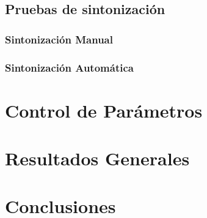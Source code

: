 \documentclass{beamer}
\begin{document}
\subsection{Pruebas de sintonización}
\subsubsection{Sintonización Manual}

\subsubsection{Sintonización Automática}

\section{Control de Parámetros}


\section{Resultados Generales}


\section{Conclusiones}

\end{document}
